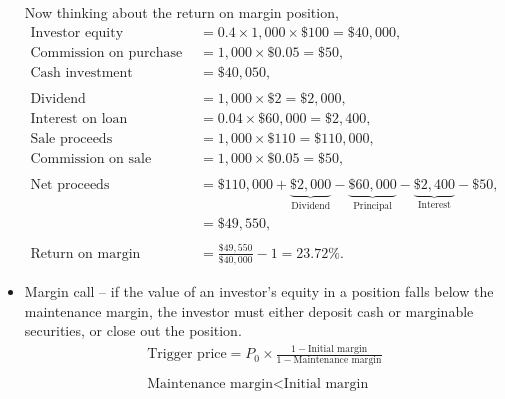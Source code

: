 \documentclass[../notes_compiled.tex]{subfiles}
\begin{document}
\begin{itemize}
{Now thinking about the return on margin position,
\begin{align*}
\text{Investor equity} &= 0.4 \times 1,000 \times \$100 = \$40,000, \\
\text{Commission on purchase} &= 1,000\times\$0.05 = \$50, \\
\text{Cash investment} &= \$40,050, \\ \\
\text{Dividend} &= 1,000 \times \$2 = \$2,000, \\
\text{Interest on loan} &= 0.04 \times \$60,000  = \$2,400, \\
\text{Sale proceeds} &= 1,000 \times \$110 = \$110,000, \\
\text{Commission on sale} &= 1,000 \times \$0.05 = \$50, \\ \\
\text{Net proceeds} &= \$110,000 + \underbrace{\$2,000}_{\text{Dividend}} - \underbrace{\$60,000}_{\text{Principal}} - \underbrace{\$2,400}_{\text{Interest}} - \$50, \\
&=\$49,550, \\ \\
\text{Return on margin position} &= \frac{\$49,550}{\$40,000}-1 = 23.72\%.
\end{align*}
}

\item Margin call -- if the value of an investor’s equity in a position falls below the maintenance margin, the investor must either deposit cash or marginable securities, or close out the position.
\begin{gather}
\text{Trigger price} = P_{0} \times \frac{1-\text{Initial margin}}{1-\text{Maintenance margin}} \\ \nonumber \\
\text{Maintenance margin} < \text{Initial margin} \nonumber
\end{gather}

\end{itemize}
\end{document}
